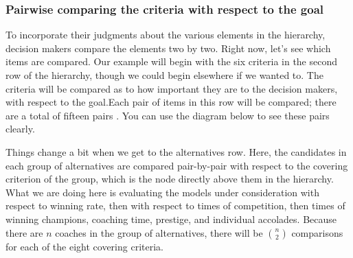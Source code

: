 \documentclass{mcmthesis}
\begin{document}
\subsubsection{Pairwise comparing the criteria with respect to the goal}
\par To incorporate their judgments about the various elements in the hierarchy, decision makers compare the elements two by two.  Right now, let's see which items are compared. Our example will begin with the six criteria in the second row of the hierarchy, though we could begin elsewhere if we wanted to. The criteria will be compared as to how important they are to the decision makers, with respect to the goal.Each pair of items in this row will be compared; there are a total of fifteen pairs . You can use the diagram below to see these pairs clearly.
\par Things change a bit when we get to the alternatives row. Here, the candidates in each group of alternatives are compared pair-by-pair with respect to the covering criterion of the group, which is the node directly above them in the hierarchy. What we are doing here is evaluating the models under consideration with respect to winning rate, then with respect to times of competition, then times of winning champions, coaching time, prestige, and individual accolades. Because there are $n$ coaches in the group of alternatives, there will be $\binom{n}{2}$ comparisons for each of the eight covering criteria.
\end{document}
